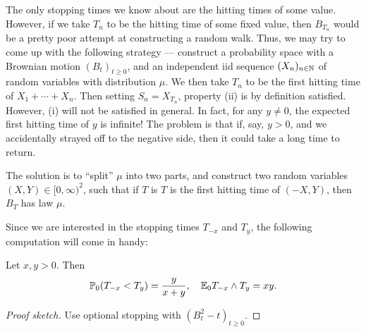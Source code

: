 \documentclass[a4paper]{article}
\begin{document}
The only stopping times we know about are the hitting times of some value. However, if we take $T_n$ to be the hitting time of some fixed value, then $B_{T_n}$ would be a pretty poor attempt at constructing a random walk. Thus, we may try to come up with the following strategy --- construct a probability space with a Brownian motion $(B_t)_{t \geq 0}$, and an independent iid sequence $(X_n)_{n \in \mathbb{N}}$ of random variables with distribution $\mu$. We then take $T_n$ to be the first hitting time of $X_1 + \cdots + X_n$. Then setting $S_n = X_{T_n}$, property (ii) is by definition satisfied. However, (i) will not be satisfied in general. In fact, for any $y \not= 0$, the expected first hitting time of $y$ is infinite! The problem is that if, say, $y > 0$, and we accidentally strayed off to the negative side, then it could take a long time to return.

The solution is to ``split'' $\mu$ into two parts, and construct two random variables $(X, Y) \in [0, \infty)^2$, such that if $T$ is $T$ is the first hitting time of $(-X, Y)$, then $B_T$ has law $\mu$.

Since we are interested in the stopping times $T_{-x}$ and $T_y$, the following computation will come in handy:
\begin{lemma}
  Let $x, y > 0$. Then
  \[
    \mathbb{P}_0(T_{-x} < T_y) = \frac{y}{x + y},\quad \mathbb{E}_0 T_{-x} \wedge T_y = xy.
  \]
\end{lemma}

\begin{proof}[Proof sketch]
  Use optional stopping with $(B_t^2 - t)_{t \geq 0}$.
\end{proof}
\end{document}

